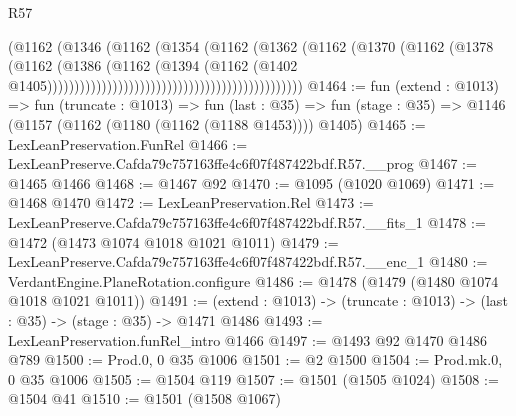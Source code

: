 \begin{lexlean}{R57}
\begin{coremodule}
                                                                  (@1162
                                                                    (@1346
                                                                      (@1162
                                                                        (@1354
                                                                          (@1162
                                                                            (@1362
                                                                              (@1162
                                                                                (@1370
                                                                                  (@1162
                                                                                    (@1378
                                                                                      (@1162
                                                                                        (@1386
                                                                                          (@1162
                                                                                            (@1394
                                                                                              (@1162
                                                                                                (@1402
                                                                                                  @1405)))))))))))))))))))))))))))))))))))))))))))))))
@1464 := fun (extend : @1013) =>
  fun (truncate : @1013) =>
  fun (last : @35) => fun (stage : @35) => @1146 (@1157 (@1162 (@1180 (@1162 (@1188 @1453)))) @1405)
@1465 := LexLeanPreservation.FunRel
@1466 := LexLeanPreserve.Cafda79c757163ffe4c6f07f487422bdf.R57.__prog
@1467 := @1465 @1466
@1468 := @1467 @92
@1470 := @1095 (@1020 @1069)
@1471 := @1468 @1470
@1472 := LexLeanPreservation.Rel
@1473 := LexLeanPreserve.Cafda79c757163ffe4c6f07f487422bdf.R57.__fits_1
@1478 := @1472 (@1473 @1074 @1018 @1021 @1011)
@1479 := LexLeanPreserve.Cafda79c757163ffe4c6f07f487422bdf.R57.__enc_1
@1480 := VerdantEngine.PlaneRotation.configure
@1486 := @1478 (@1479 (@1480 @1074 @1018 @1021 @1011))
@1491 := (extend : @1013) -> (truncate : @1013) -> (last : @35) -> (stage : @35) -> @1471 @1486
@1493 := LexLeanPreservation.funRel_intro @1466
@1497 := @1493 @92 @1470 @1486 @789
@1500 := Prod.{0, 0} @35 @1006
@1501 := @2 @1500
@1504 := Prod.mk.{0, 0} @35 @1006
@1505 := @1504 @119
@1507 := @1501 (@1505 @1024)
@1508 := @1504 @41
@1510 := @1501 (@1508 @1067)

\end{coremodule}
\end{lexlean}

